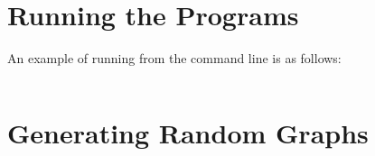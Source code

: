 \documentclass{l4proj}
\begin{document}
\begin{appendices}

\chapter{Running the Programs}
An example of running from the command line is as follows:
\begin{verbatim}
\end{verbatim}


\chapter{Generating Random Graphs}
\label{sec:randomGraph}

\begin{verbatim}
\end{verbatim}
\end{appendices}




\end{document}
